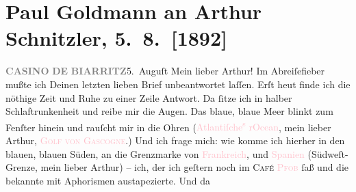 

               \section[Paul Goldmann an Arthur Schnitzler, 5. 8. {[}1892{]}]{ Paul Goldmann an Arthur Schnitzler, 5. 8. {[}1892{]}}\nopagebreak{}\rehead{ }\normalsize\beginnumbering{} \toendnotes[C]{\smallbreak\pagebreak[2]} 
\toendnotes[C]{\smallbreak}\pstart
           \noindent{}{\pb}\textcolor{brown}{\textcolor{gray}{\textbf{CASINO}}}{}\ledrightnote{\textcolor{brown}{Casino de Biarritz}}\pend
           \pstart
           \textcolor{brown}{\textcolor{gray}{\textbf{DE}}}{}\ledrightnote{\textcolor{brown}{Casino de Biarritz}}\pend
           \pstart
           \textcolor{brown}{\textcolor{gray}{\textbf{BIARRITZ}}}{}\ledrightnote{\textcolor{brown}{Casino de Biarritz}}\hfill 5. Auguſt\pend
           \pstart
           Mein lieber Arthur!\pend
           \pstart
           Im Abreiſefieber mußte ich Deinen letzten lieben Brief unbeantwortet laſſen. Erſt
                  heut finde ich die nöthige Zeit und Ruhe zu einer
               Zeile Antwort. Da ſitze ich in halber Schlaftrunkenheit und reibe mir die Augen. Das
               blaue, blaue Meer blinkt zum Fenſter hinein und rauſcht mir in die Ohren (\textcolor{pink}{Atlantiſche\substVorne{}\textsuperscript{s }\substDazwischen{}r\substHinten{}{\pb}Ocean}{}\ledrightnote{\textcolor{pink}{Atlantischer Ozean}}, mein lieber Arthur, \textsc{\textcolor{pink}{Golf von Gascogne}{}\ledrightnote{\textcolor{pink}{Biskaya}}}.) Und ich frage mich: wie  komme ich hierher
               in den blauen, blauen Süden,  an die Grenzmarke
               von \textcolor{pink}{Frankreich}{}\ledrightnote{\textcolor{pink}{Frankreich}}, und \textcolor{pink}{Spanien}{}\ledrightnote{\textcolor{pink}{Spanien}} (Südweſt-Grenze, mein lieber Arthur) – ich, der
               ich geſtern noch im \textsc{Café \textcolor{pink}{Pfob}{}\ledrightnote{\textcolor{pink}{Café Pfob}}} ſaß und die bekannte \label{K_L02701-1v}\label{K_L02701-1h} mit Aphorismen austapezierte. Und da
